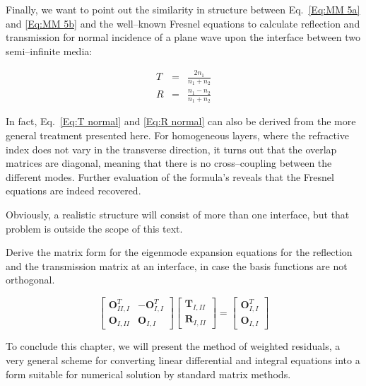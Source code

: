 Finally, we want to point out the similarity in structure between Eq.~\ref{Eq:MM 5a} and \ref{Eq:MM 5b} and the well--known Fresnel equations to calculate reflection and transmission for normal incidence of a plane wave upon the interface between two semi--infinite media:

\begin{eqnarray}
T & = & \frac{2n_{1}}{n_{1}+n_{2}}\label{Eq:T normal} \\
R & = & \frac{n_{1}-n_{2}}{n_{1}+n_{2}}\label{Eq:R normal} 
\end{eqnarray}

In fact, Eq.~\ref{Eq:T normal} and \ref{Eq:R normal} can also be derived from the more general treatment presented here. For homogeneous layers, where the refractive index does not vary in the transverse direction, it turns out that the overlap matrices are diagonal, meaning that there is no cross--coupling between the different modes. Further evaluation of the formula's reveals that the Fresnel equations are indeed recovered.

Obviously, a realistic structure will consist of more than one interface, but that problem is outside the scope of this text.


\begin{exer}
Derive the matrix form for the eigenmode expansion equations for the reflection and the transmission matrix at an interface, in case the basis functions are not orthogonal.

\begin{sol}
$$ \begin{bmatrix} \mathbf{O}^{T}_{II,I} & -\mathbf{O}^{T}_{I,I} \\ \mathbf{O}_{I,II} & \mathbf{O}_{I,I} \end{bmatrix} \begin{bmatrix} \mathbf{T}_{I,II} \\ \mathbf{R}_{I,II} \end{bmatrix} =  \begin{bmatrix} \mathbf{O}^{T}_{I,I} \\ \mathbf{O}_{I,I} \end{bmatrix} $$
\end{sol}

\end{exer}


\pagebreak



To conclude this chapter, we will present the method of weighted residuals, a very general scheme for converting linear differential and integral equations into a form suitable for numerical solution by standard matrix methods.

